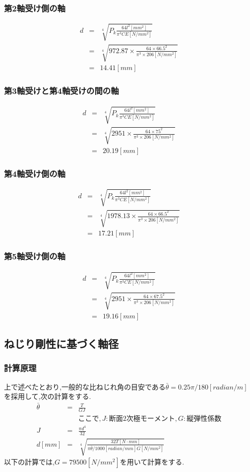 \subsubsection{第2軸受け側の軸}
\begin{eqnarray}
d&=&\sqrt[4]{P_k\frac{64l^2[mm^2]}{\pi^3CE[N/mm^2]}}\\
 &=&\sqrt[4]{972.87 \times \frac{64\times 66.5^2}{\pi^3 \times 206[N/mm^2]}}\\
 &=&14.41[mm]
\end{eqnarray}
\subsubsection{第3軸受けと第4軸受けの間の軸}
\begin{eqnarray}
d&=&\sqrt[4]{P_k\frac{64l^2[mm^2]}{\pi^3CE[N/mm^2]}}\\
 &=&\sqrt[4]{2951 \times \frac{64\times 75^2}{\pi^3 \times 206[N/mm^2]}}\\
 &=&20.19[mm]
\end{eqnarray}
\subsubsection{第4軸受け側の軸}
\begin{eqnarray}
d&=&\sqrt[4]{P_k\frac{64l^2[mm^2]}{\pi^3CE[N/mm^2]}}\\
 &=&\sqrt[4]{1978.13 \times \frac{64\times 66.5^2}{\pi^3 \times 206[N/mm^2]}}\\
 &=&17.21[mm]
\end{eqnarray}
\subsubsection{第5軸受け側の軸}
\begin{eqnarray}
d&=&\sqrt[4]{P_k\frac{64l^2[mm^2]}{\pi^3CE[N/mm^2]}}\\
 &=&\sqrt[4]{2951 \times \frac{64\times 67.5^2}{\pi^3 \times 206[N/mm^2]}}\\
 &=&19.16[mm]
\end{eqnarray}

\subsection{ねじり剛性に基づく軸径}
\subsubsection{計算原理}
上で述べたとおり,一般的な比ねじれ角の目安である$\bar{\theta} = 0.25\pi /180 [radian/m]$を採用して,次の計算をする.
\begin{eqnarray}
\bar{\theta} &=& \frac{T}{GJ}\\
&&ここで,J:断面2次極モーメント,G:縦弾性係数\\
J&=&\frac{\pi d^4}{32}\\
d[mm]&=&\sqrt[4]{\frac{32T[N \cdot mm]}{\pi \bar{\theta}/1000[radian/mm] G[N/mm^2]}}
\end{eqnarray}
以下の計算では,$G=79500[N/mm^2]$を用いて計算をする.
